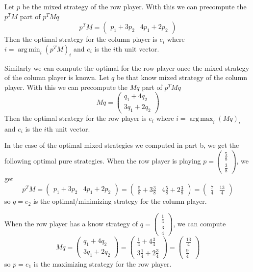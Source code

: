 \documentclass[10pt,a4paper]{article}
\DeclareMathOperator*{\argmin}{arg\,min}
\DeclareMathOperator*{\argmax}{arg\,max}
\begin{document}
Let $p$ be the mixed strategy of the row player.
With this we can precompute the $p^{T}M$ part of $p^{T}Mq$
\begin{equation*}
  p^{T}M = \begin{pmatrix}
    p_{1} + 3p_{2} & 4p_{1} + 2p_{2}
  \end{pmatrix}
\end{equation*}
Then the optimal strategy for the column player is $e_{i}$ where $i = \argmin_{i} (p^{T}M)_{i}$ and $e_{i}$ is the $i$th unit vector.

Similarly we can compute the optimal for the row player once the mixed strategy of the column player is known.
Let $q$ be that know mixed strategy of the column player.
With this we can precompute the $Mq$ part of $p^{T}Mq$
\begin{equation*}
  Mq = \begin{pmatrix}
    q_{1} + 4q_{2}\\
    3q_{1} + 2q_{2}
  \end{pmatrix}
\end{equation*}
Then the optimal strategy for the row player is $e_{i}$ where $i = \argmax_{i} (Mq)_{i}$ and $e_{i}$ is the $i$th unit vector.

In the case of the optimal mixed strategies we computed in part b, we get the following optimal pure strategies.
When the row player is playing $p = \begin{pmatrix}
  \frac{5}{8}\\\frac{3}{8}
\end{pmatrix}$, we get
\begin{equation*}
  p^{T}M = \begin{pmatrix}
    p_{1} + 3p_{2} & 4p_{1} + 2p_{2}
  \end{pmatrix} = \begin{pmatrix}
    \frac{5}{8} + 3\frac{3}{8} & 4 \frac{5}{8} + 2 \frac{3}{8}
  \end{pmatrix} = \begin{pmatrix}
    \frac{7}{4} & \frac{13}{4}
  \end{pmatrix}
\end{equation*}
so $q = e_{2}$ is the optimal/minimizing strategy for the column player.

When the row player has a know strategy of $q = \begin{pmatrix}
  \frac{1}{4}\\\frac{3}{4}
\end{pmatrix}$, we can compute
\begin{equation*}
  Mq = \begin{pmatrix}
    q_{1} + 4q_{2}\\
    3q_{1} + 2q_{2}
  \end{pmatrix} = \begin{pmatrix}
    \frac{1}{4} + 4 \frac{3}{4}\\
    3 \frac{1}{4} + 2 \frac{3}{4}
  \end{pmatrix} = \begin{pmatrix}
    \frac{13}{4}\\
    \frac{9}{4}
  \end{pmatrix}
\end{equation*}
so $p = e_{1}$ is the maximizing strategy for the row player.
\end{document}
